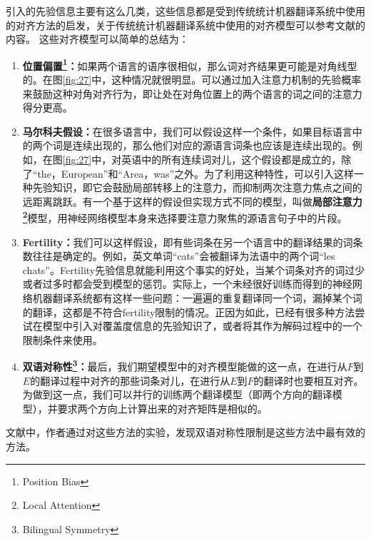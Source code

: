 \documentclass[10pt,a4paper]{ctexart}
\begin{document}
引入的先验信息主要有这么几类，这些信息都是受到传统统计机器翻译系统中使用的对齐方法的启发，关于传统统计机器翻译系统中使用的对齐模型可以参考文献\cite{brown1993mathematics}的内容。
这些对齐模型可以简单的总结为：
\begin{enumerate}
\item[] \textbf{位置偏置\footnote{Position Bias}：}如果两个语言的语序很相似，那么词对齐结果更可能是对角线型的。在图\ref{fig:27}中，这种情况就很明显。可以通过加入注意力机制的先验概率来鼓励这种对角对齐行为，即让处在对角位置上的两个语言的词之间的注意力得分更高。
\item[] \textbf{马尔科夫假设：}在很多语言中，我们可以假设这样一个条件，如果目标语言中的两个词是连续出现的，那么他们对应的源语言词条也应该是连续出现的。例如，在图\ref{fig:27}中，对英语中的所有连续词对儿，这个假设都是成立的，除了“the，European”和“Area，was”之外。为了利用这种特性，可以引入这样一种先验知识，即它会鼓励局部转移上的注意力，而抑制两次注意力焦点之间的远距离跳跃。有一个基于这样的假设但实现方式不同的模型，叫做\textbf{局部注意力\footnote{Local Attention}}模型\cite{luong2015effective}，用神经网络模型本身来选择要注意力聚焦的源语言句子中的片段。
\item[] \textbf{Fertility：}我们可以这样假设，即有些词条在另一个语言中的翻译结果的词条数往往是确定的。例如，英文单词“cats”会被翻译为法语中的两个词“les chats”。Fertility先验信息就能利用这个事实的好处，当某个词条对齐的词过少或者过多时都会受到模型的惩罚。实际上，一个未经很好训练而得到的神经网络机器翻译系统都有这样一些问题：一遍遍的重复翻译同一个词，漏掉某个词的翻译，这都是不符合fertility限制的情况。正因为如此，已经有很多种方法尝试在模型中引入对覆盖度信息的先验知识了\cite{tu2016modeling,mi2016coverage}，或者将其作为解码过程中的一个限制条件来使用\cite{wu2016google}。
\item[] \textbf{双语对称性\footnote{Bilingual Symmetry}：}最后，我们期望模型中的对齐模型能做的这一点，在进行从$F$到$E$的翻译过程中对齐的那些词条对儿，在进行从$E$到$F$的翻译时也要相互对齐。为做到这一点，我们可以并行的训练两个翻译模型（即两个方向的翻译模型），并要求两个方向上计算出来的对齐矩阵是相似的。
\end{enumerate}
文献\cite{cohn2016incorporating}中，作者通过对这些方法的实验，发现双语对称性限制是这些方法中最有效的方法。
\end{document}
